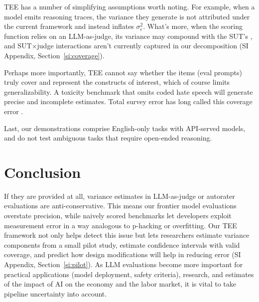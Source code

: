 \documentclass{article}
\begin{document}
TEE has a number of simplifying assumptions worth noting. For example, when a model emits reasoning traces, the variance they generate is not attributed under the current framework and instead inflates $\sigma^2_\epsilon$. What's more, when the scoring function relies on an LLM-as-judge, its variance may compound with the SUT's \citep{haldar2025roulette, chehbouni2025neither}, and SUT$\times$judge interactions aren't currently captured in our decomposition (SI Appendix, Section~\ref{si:coverage}). 

Perhaps more importantly, TEE cannot say whether the items (eval prompts) truly cover and represent the constructs of interest, which of course limits generalizability. A toxicity benchmark that omits coded hate speech will generate precise and incomplete estimates. Total survey error has long called this coverage error \citep{sen2019tedon}.

Last, our demonstrations comprise English-only tasks with API-served models, and do not test ambiguous tasks that require open-ended reasoning. 


\section{Conclusion}
\label{sec:conclusion}

If they are provided at all, variance estimates in LLM-as-judge or autorater evaluations are anti-conservative. This means our frontier model evaluations overstate precision, while naively scored benchmarks let developers exploit measurement error in a way analogous to p-hacking or overfitting. Our TEE framework not only helps detect this issue but lets researchers estimate variance components from a small pilot study, estimate confidence intervals with valid coverage, and predict how design modifications will help in reducing error (SI Appendix, Section~\ref{si:pilot}). As LLM evaluations become more important for practical applications (model deployment, safety criteria), research, and estimates of the impact of AI on the economy and the labor market, it is vital to take pipeline uncertainty into account.
\end{document}
